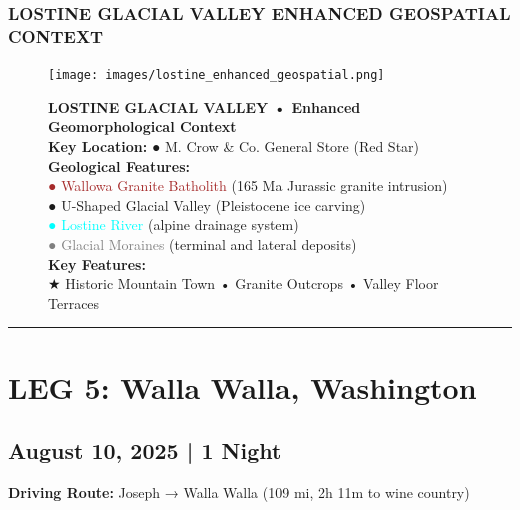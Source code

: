 \documentclass[
  11pt,
]{article}
\begin{document}
\subsubsection{\texorpdfstring{\textcolor{primary}{LOSTINE GLACIAL VALLEY ENHANCED GEOSPATIAL CONTEXT}}{}}\label{section-31}

\begin{figure}[H]
\centering
\texttt{[image: images/lostine\_enhanced\_geospatial.png]}
\caption{\textbf{\textcolor{primary}{LOSTINE GLACIAL VALLEY • Enhanced Geomorphological Context}} \\ 
\textbf{\textcolor{secondary}{Key Location:}} \textcolor{mapred}{●} M. Crow \& Co. General Store (Red Star) \\
\textbf{\textcolor{secondary}{Geological Features:}} \\
\textcolor{brown}{●} \textcolor{brown}{Wallowa Granite Batholith} (165 Ma Jurassic granite intrusion) \\
\textcolor{mapblue}{●} \textcolor{mapblue}{U-Shaped Glacial Valley} (Pleistocene ice carving) \\
\textcolor{cyan}{●} \textcolor{cyan}{Lostine River} (alpine drainage system) \\
\textcolor{gray}{●} \textcolor{gray}{Glacial Moraines} (terminal and lateral deposits) \\
\textbf{\textcolor{secondary}{Key Features:}} \\
\textcolor{mapred}{★} Historic Mountain Town • Granite Outcrops • Valley Floor Terraces}
\end{figure}

\begin{center}\rule{0.5\linewidth}{0.5pt}\end{center}

\newpage

\section{\texorpdfstring{\textcolor{primary}{LEG 5: Walla Walla, Washington}}{}}\label{section-32}

\subsection{\texorpdfstring{\textcolor{secondary}{August 10, 2025 | 1 Night}}{}}\label{section-33}

\textbf{\textcolor{secondary}{Driving Route:}} Joseph → Walla Walla (109
mi, 2h 11m to wine country)
\end{document}
